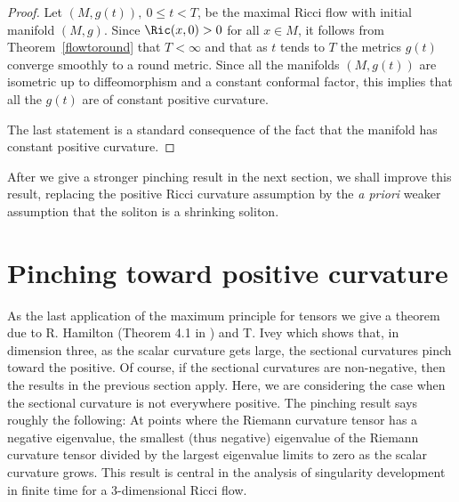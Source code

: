 \begin{proof}
Let $(M,g(t)),\ 0\le t<T$, be the maximal Ricci flow with initial
manifold $(M,g)$. Since $\Ric(x,0)>0$ for all $x\in M$, it
follows from Theorem~\ref{flowtoround} that $T<\infty$ and that as
$t$ tends to $T$ the metrics $g(t)$ converge smoothly to a round
metric. Since all the manifolds $(M,g(t))$ are isometric up to
diffeomorphism and a constant conformal factor, this implies that
all the $g(t)$ are of constant positive curvature.

The last statement is a standard consequence of the fact that the
manifold has constant positive curvature.
\end{proof}


\begin{remark}
\label{rem:roundness-shrinking-soliton-preview}
After we give a stronger pinching result in the next section, we
shall improve this result, replacing the positive Ricci curvature
assumption by the {\em a priori} weaker assumption that the soliton
is a shrinking soliton.
\end{remark}




\section{Pinching toward positive
curvature}

As the last application of the maximum principle for tensors we give
a theorem due to R. Hamilton (Theorem 4.1 in \cite{HamiltonNSRF3M})
and T. Ivey \cite{Ivey} which shows that, in dimension three, as the
scalar curvature gets large, the sectional curvatures pinch toward
the positive. Of course, if the sectional curvatures are
non-negative, then the results in the previous section apply. Here,
we are considering the case when the sectional curvature is not
everywhere positive. The pinching result says roughly the following:
At points where the Riemann curvature tensor has a negative
eigenvalue, the smallest (thus negative) eigenvalue of the Riemann
curvature tensor divided by the largest eigenvalue limits to zero as
the scalar curvature grows. This result is central in the analysis
of singularity development in finite time for a $3$-dimensional
Ricci flow.

